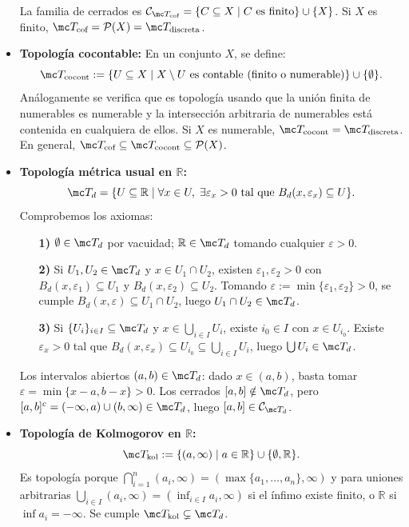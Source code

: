 \begin{ejem}
\begin{itemize}
    La familia de cerrados es \(\mathcal{C}_{\mc T_{\text{cof}}} = \{C \subseteq X \mid C \text{ es finito}\} \cup \{X\}\). Si \(X\) es finito, \(\mc T_{\text{cof}} = \mathcal{P}(X) = \mc T_{\text{discreta}}\).
    \item \textbf{Topología cocontable:} En un conjunto \(X\), se define:
    \[
        \mc T_{\text{cocont}} := \{U \subseteq X \mid X \setminus U \text{ es contable (finito o numerable)}\} \cup \{\emptyset\} \text{}.
    \]
    Análogamente se verifica que es topología usando que la unión finita de numerables es numerable y la intersección arbitraria de numerables está contenida en cualquiera de ellos. Si \(X\) es numerable, \(\mc T_{\text{cocont}} = \mc T_{\text{discreta}}\). En general, \(\mc T_{\text{cof}} \subseteq \mc T_{\text{cocont}} \subseteq \mathcal{P}(X)\).
    \item \textbf{Topología métrica usual en \(\mathbb{R}\):}
    \[
        \mc T_d = \{U \subseteq \mathbb{R} \mid \forall x \in U, \; \exists \varepsilon_x > 0 \text{ tal que } B_d(x, \varepsilon_x) \subseteq U\} \text{}.
    \]
    Comprobemos los axiomas:
    \begin{enumerate}
        \item[\textbf{1)}] \(\emptyset \in \mc T_d\) por vacuidad; \(\mathbb{R} \in \mc T_d\) tomando cualquier \(\varepsilon > 0\).
        \item[\textbf{2)}] Si \(U_1, U_2 \in \mc T_d\) y \(x \in U_1 \cap U_2\), existen \(\varepsilon_1, \varepsilon_2 > 0\) con \(B_d(x, \varepsilon_1) \subseteq U_1\) y \(B_d(x, \varepsilon_2) \subseteq U_2\). Tomando \(\varepsilon := \min\{\varepsilon_1, \varepsilon_2\} > 0\), se cumple \(B_d(x, \varepsilon) \subseteq U_1 \cap U_2\), luego \(U_1 \cap U_2 \in \mc T_d\).
        \item[\textbf{3)}] Si \(\{U_i\}_{i \in I} \subseteq \mc T_d\) y \(x \in \bigcup_{i \in I} U_i\), existe \(i_0 \in I\) con \(x \in U_{i_0}\). Existe \(\varepsilon_x > 0\) tal que \(B_d(x, \varepsilon_x) \subseteq U_{i_0} \subseteq \bigcup_{i \in I} U_i\), luego \(\bigcup U_i \in \mc T_d\).
    \end{enumerate}
    Los intervalos abiertos \((a, b) \in \mc T_d\): dado \(x \in (a, b)\), basta tomar \(\varepsilon = \min\{x - a, b - x\} > 0\). Los cerrados \([a, b] \notin \mc T_d\), pero \([a, b]^c = (-\infty, a) \cup (b, \infty) \in \mc T_d\), luego \([a, b] \in \mathcal{C}_{\mc T_d}\).
    \item \textbf{Topología de Kolmogorov en \(\mathbb{R}\):}
    \[
        \mc T_{\text{kol}} := \{(a, \infty) \mid a \in \mathbb{R}\} \cup \{\emptyset, \mathbb{R}\} \text{}.
    \]
    Es topología porque \(\bigcap_{i=1}^n (a_i, \infty) = (\max\{a_1, \ldots, a_n\}, \infty)\) y para uniones arbitrarias \(\bigcup_{i \in I} (a_i, \infty) = (\inf_{i \in I} a_i, \infty)\) si el ínfimo existe finito, o \(\mathbb{R}\) si \(\inf a_i = -\infty\). Se cumple \(\mc T_{\text{kol}} \subsetneq \mc T_d\).
\end{itemize}
\end{ejem}

